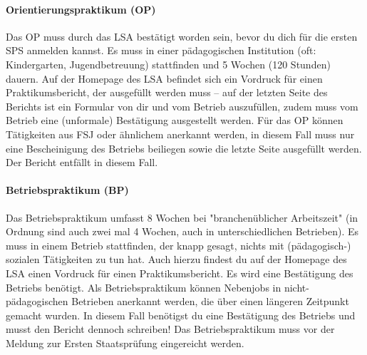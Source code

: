 \paragraph{Orientierungspraktikum (OP)}
Das OP muss durch das LSA bestätigt worden sein, bevor du dich für die ersten SPS anmelden kannst. Es muss in einer pädagogischen Institution (oft: Kindergarten, Jugendbetreuung) stattfinden und 5 Wochen (120 Stunden) dauern. Auf der Homepage des LSA befindet sich ein Vordruck für einen Praktikumsbericht, der ausgefüllt werden muss – auf der letzten Seite des Berichts ist ein Formular von dir und vom Betrieb auszufüllen, zudem muss vom Betrieb eine (unformale) Bestätigung ausgestellt werden.
Für das OP können Tätigkeiten aus FSJ oder ähnlichem anerkannt werden, in diesem Fall muss nur eine Bescheinigung des Betriebs beiliegen sowie die letzte Seite ausgefüllt werden. Der Bericht entfällt in diesem Fall.

\paragraph{Betriebspraktikum (BP)}
Das Betriebspraktikum umfasst 8 Wochen bei "branchenüblicher Arbeitszeit" (in Ordnung sind auch zwei mal 4 Wochen, auch in unterschiedlichen Betrieben). Es muss in einem Betrieb stattfinden, der knapp gesagt, nichts mit (pädagogisch-) sozialen Tätigkeiten zu tun hat. Auch hierzu findest du auf der Homepage des LSA einen Vordruck für einen Praktikumsbericht. Es wird eine Bestätigung des Betriebs benötigt.
Als Betriebspraktikum können Nebenjobs in nicht-pädagogischen Betrieben anerkannt werden, die über einen längeren Zeitpunkt gemacht wurden. In diesem Fall benötigst du eine Bestätigung des Betriebs und musst den Bericht dennoch schreiben!
Das Betriebspraktikum muss vor der Meldung zur Ersten Staatsprüfung eingereicht werden.
